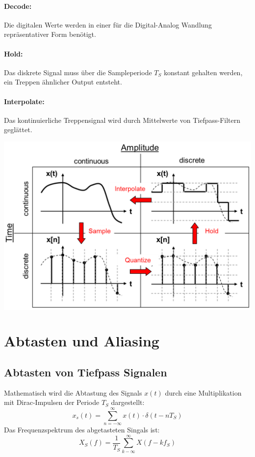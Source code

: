 \paragraph{Decode:} Die digitalen Werte werden in einer für die Digital-Analog
Wandlung repräsentativer Form benötigt.

\paragraph{Hold:} Das diskrete Signal muss über die Sampleperiode $T_S$ konstant
gehalten werden, ein Treppen ähnlicher Output entsteht.

\paragraph{Interpolate:} Das kontinuierliche Treppensignal wird durch Mittelwerte
von Tiefpass-Filtern geglättet.

\begin{center}
	\includegraphics[scale=.7]{./images/ad_da}
\end{center}

\section{Abtasten und Aliasing}
\subsection{Abtasten von Tiefpass Signalen}
Mathematisch wird die Abtastung des Signals $x(t)$ durch eine Multiplikation
mit Dirac-Impulsen der Periode $T_S$ dargestellt:
\[ x_s(t) = \sum_{n=-\infty}^{\infty} x(t) \cdot \delta(t-nT_S) \]
Das Frequenzspektrum des abgetasteten Singals ist:
\[ X_S(f) = \frac{1}{T_S} \sum_{k-\infty}^{\infty} X(f-kf_S) \]

